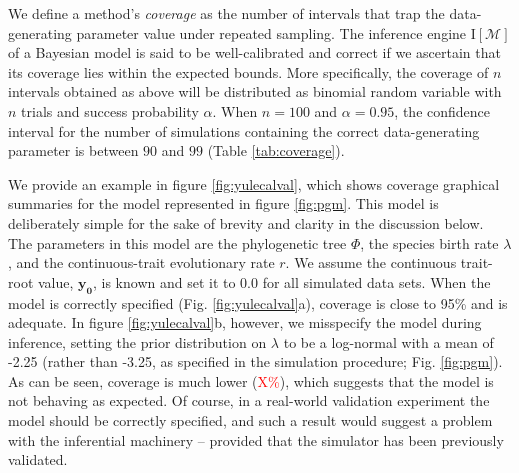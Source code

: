 \documentclass[oneside]{article}
\begin{document}
We define a method's \textit{coverage} as the number of intervals that trap the data-generating parameter value under repeated sampling. 
The inference engine $\text{I}[\mathcal{M}]$ of a Bayesian model
is said to be well-calibrated and correct if we ascertain that its coverage lies within the expected bounds.
More specifically, the coverage of $n$ intervals obtained as above
will be distributed as binomial random variable with $n$ trials and
success probability $\alpha$.
When $n=100$ and $\alpha = 0.95$, the confidence interval for the
number of simulations containing the correct data-generating parameter
is between $90$ and $99$ (Table \ref{tab:coverage}).

We provide an example in figure \ref{fig:yulecalval}, which shows 
coverage graphical summaries for the model represented in
figure \ref{fig:pgm}.
This model is deliberately simple for the sake of brevity and clarity
in the discussion below.
The parameters in this model are the phylogenetic tree $\Phi$, the
species birth rate $\lambda$, and the continuous-trait evolutionary rate
$r$.
We assume the continuous trait-root value, $\boldsymbol{y_0}$, is
known and set it to $\boldsymbol{0.0}$ for all simulated data sets.
When the model is correctly specified (Fig. \ref{fig:yulecalval}a),
coverage is close to 95\% and is adequate.
In figure \ref{fig:yulecalval}b, however, we misspecify the model
during inference, setting the prior distribution on
$\lambda$ to be a log-normal with  a mean of -2.25 (rather than -3.25,
as specified in the simulation procedure; Fig. \ref{fig:pgm}).
As can be seen, coverage is much lower (\textcolor{red}{X\%}), which
suggests that the model is not behaving as expected.
Of course, in a real-world validation experiment the model should
be correctly specified, and such a result would suggest a problem
with the inferential machinery -- provided that the simulator has been
previously validated.
\end{document}
